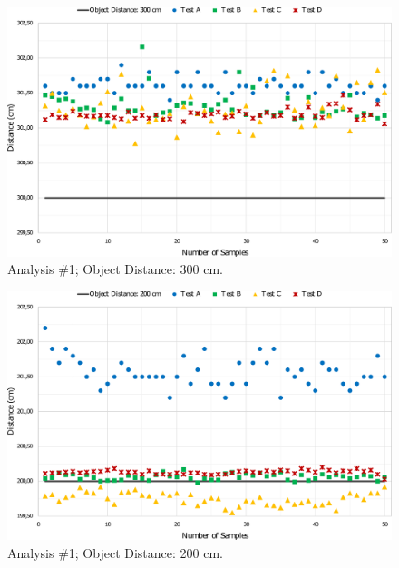 \begin{figure}[h!]
    \centering
    \includegraphics[scale=0.52]{images/Results/testing_methodology/300cm.pdf}
    \caption{Analysis \#1; Object Distance: 300 cm.}
    \label{fig:300cm}
\end{figure}

\begin{figure}[h!]
    \centering
    \includegraphics[scale=0.52]{images/Results/testing_methodology/200cm.pdf}
    \caption{Analysis \#1; Object Distance: 200 cm.}
    \label{fig:200cm}
\end{figure}

